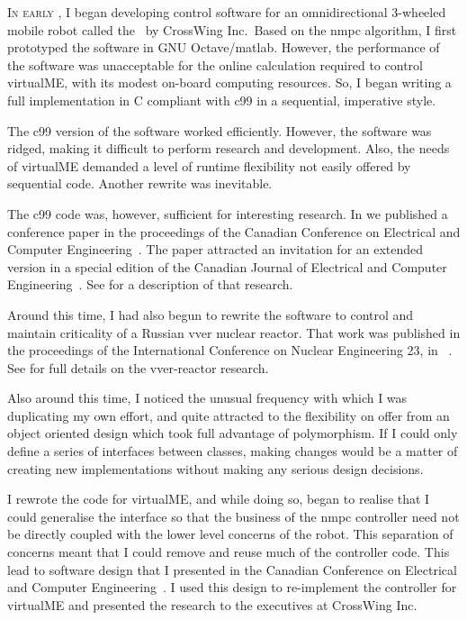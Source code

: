 \textsc{In early} , I began developing control software for an
omnidirectional 3-wheeled mobile robot called the \virtualmeR\ by CrossWing
Inc.\ Based on the \ac{nmpc} algorithm, I first prototyped the software in GNU
Octave/\acs{matlab}. However, the performance of the software was unacceptable
for the online calculation required to control virtualME, with its modest
on-board computing resources. So, I began writing a full implementation in C
compliant with \acf{c99} in a sequential, imperative style.

The \ac{c99} version of the software worked efficiently. However, the software
was ridged, making it
difficult to perform research and development. Also, the needs of virtualME
demanded a level of runtime flexibility not easily offered by sequential code.
Another rewrite was inevitable.

The \ac{c99} code was, however, sufficient for interesting research. In
 we published a conference paper in the proceedings of the Canadian
Conference on Electrical and Computer Engineering~\cite{Teatro2013}. The paper
attracted an invitation for an extended version in a special edition of the
Canadian Journal of Electrical and Computer Engineering~\cite{Teatro2014}. See
 for a description of that research.

Around this time, I had also begun to rewrite the software to control and
maintain criticality of a Russian \ac{vver} nuclear reactor. That work was
published in the proceedings of the International Conference on Nuclear
Engineering 23, in ~\cite{Teatro2015}. See 
for full details on the \ac{vver}-reactor research.

Also around this time, I noticed the unusual frequency with which I was
duplicating my own effort, and quite attracted to the flexibility on offer from
an object oriented design which took full advantage of polymorphism. If I could
only define a series of interfaces between classes, making changes would be a
matter of creating new implementations without making any serious design
decisions.

I rewrote the code for virtualME, and while doing so, began to realise that I
could generalise the interface so that the business of the \ac{nmpc} controller
need not be directly coupled with the lower level concerns of the robot. This
separation of concerns meant that I could remove and reuse much of the
controller code. This lead to software design that I presented in the
 Canadian Conference on Electrical and Computer
Engineering~\cite{Teatro2016}. I used this design to re-implement the controller
for virtualME and presented the research to the executives at CrossWing Inc.

